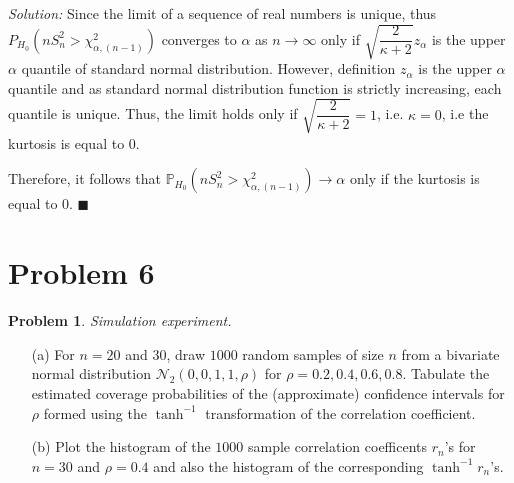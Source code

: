 \documentclass[12pt]{article}
\newcommand{\prob}{\mathbb{P}}
\newcommand{\normal}{\mathcal{N}}
\theoremstyle{definition}
\newtheorem*{prb}{Problem}
\newenvironment{problem}{\begin{tcolorbox}[colback=blue!5!white,colframe=blue!75!black, parbox = true] \begin{prb}  }{\end{prb}\end{tcolorbox} }
\newenvironment{answer}{\textit{Solution: }\quad }{ \hfill $\blacksquare$}
\numberwithin{equation}{section}
\begin{document}
\begin{answer}
    Since the limit of a sequence of real numbers is unique, thus $P_{H_0}(nS_n^2 > \chi^2_{\alpha, (n-1)})$ converges to $\alpha$ as $n \rightarrow \infty$ only if $\sqrt{\dfrac{2}{\kappa + 2}} z_\alpha$ is the upper $\alpha$ quantile of standard normal distribution. However, definition $z_\alpha$ is the upper $\alpha$ quantile and as standard normal distribution function is strictly increasing, each quantile is unique. Thus, the limit holds only if $\sqrt{\dfrac{2}{\kappa + 2}} = 1$, i.e. $\kappa = 0$, i.e the kurtosis is equal to 0.

    Therefore, it follows that $\prob_{H_0}\left( nS_n^2 > \chi^2_{\alpha, (n-1)} \right) \rightarrow \alpha$ only if the kurtosis is equal to 0.
\end{answer}


\pagebreak
\section{Problem 6}

\begin{problem}
\textit{Simulation experiment.} 
\begin{itemize}
    \item[(a)] For $n = 20$ and $30$, draw $1000$ random samples of size $n$ from a bivariate normal distribution $\normal_2(0, 0, 1, 1, \rho)$ for $\rho = 0.2, 0.4, 0.6, 0.8$. Tabulate the estimated coverage probabilities of the (approximate) confidence intervals for $\rho$ formed using the $\tanh^{-1}$ transformation of the correlation coefficient.
    
    \item[(b)] Plot the histogram of the $1000$ sample correlation coefficents $r_n$’s for $n = 30$ and $\rho = 0.4$ and also the histogram of the corresponding $\tanh^{-1}r_n$’s.
\end{itemize}
\end{problem}
\end{document}
